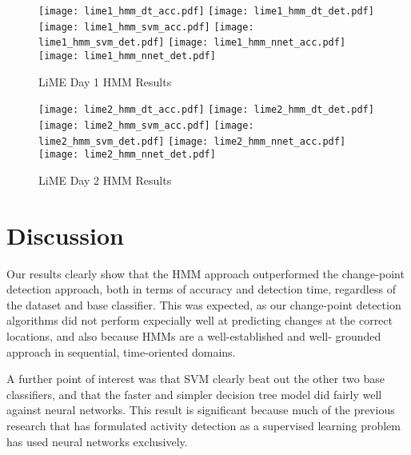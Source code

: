 \begin{figure}[H]
 \centering
 \texttt{[image: lime1\_hmm\_dt\_acc.pdf]} \hspace{1em}\vspace{1em}
 \texttt{[image: lime1\_hmm\_dt\_det.pdf]} 
 \texttt{[image: lime1\_hmm\_svm\_acc.pdf]} \hspace{1em}\vspace{1em}
 \texttt{[image: lime1\_hmm\_svm\_det.pdf]} 
 \texttt{[image: lime1\_hmm\_nnet\_acc.pdf]} \hspace{1em}
 \texttt{[image: lime1\_hmm\_nnet\_det.pdf]} 
 \caption{LiME Day 1 HMM Results}
 \label{fig:lime1_hmm}
\end{figure}

\begin{figure}[H]
 \centering
 \texttt{[image: lime2\_hmm\_dt\_acc.pdf]} \hspace{1em}\vspace{1em}
 \texttt{[image: lime2\_hmm\_dt\_det.pdf]}
 \texttt{[image: lime2\_hmm\_svm\_acc.pdf]} \hspace{1em}\vspace{1em}
 \texttt{[image: lime2\_hmm\_svm\_det.pdf]}
 \texttt{[image: lime2\_hmm\_nnet\_acc.pdf]} \hspace{1em}
 \texttt{[image: lime2\_hmm\_nnet\_det.pdf]}
 \caption{LiME Day 2 HMM Results}
 \label{fig:lime2_hmm}
\end{figure}

\newpage

\section{Discussion}

Our results clearly show that the HMM approach outperformed the change-point
detection approach, both in terms of accuracy and detection time, regardless of
the dataset and base classifier. This was expected, as our change-point
detection algorithms did not perform expecially well at predicting changes at
the correct locations, and also because HMMs are a well-established and well-
grounded approach in sequential, time-oriented domains.

A further point of interest was that SVM clearly beat out the other two
base classifiers, and that the faster and simpler decision tree model did fairly
well against neural networks. This result is significant because much of the
previous research that has formulated activity detection as a supervised learning
problem has used neural networks exclusively.
